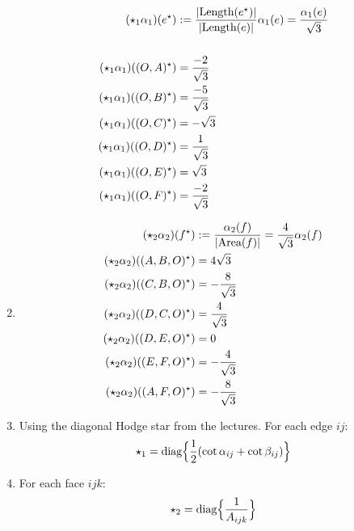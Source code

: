 \documentclass{article}
\def\nt{\notag}
\def\hal{\frac{1}{2}}
\begin{document}
\begin{enumerate}[label=(\alph*)]
    \begin{align}
        (\star_1\alpha_1)(e^\star) &:= \frac{|\text{Length}(e^\star)|}{|\text{Length}(e)|}\alpha_1(e) = \frac{\alpha_1(e)}{\sqrt3}\nt\\\nt\\
        (\star_1\alpha_1)((O,A)^\star) &= \frac{-2}{\sqrt3} \nt\\
        (\star_1\alpha_1)((O,B)^\star) &= \frac{-5}{\sqrt3} \nt\\
        (\star_1\alpha_1)((O,C)^\star) &= -\sqrt3 \nt\\
        (\star_1\alpha_1)((O,D)^\star) &= \frac{1}{\sqrt3} \nt\\
        (\star_1\alpha_1)((O,E)^\star) &= \sqrt3 \nt\\
        (\star_1\alpha_1)((O,F)^\star) &= \frac{-2}{\sqrt3} \nt
    \end{align}

    \item
    \begin{align}
        (\star_2\alpha_2)(f^\star) &:= \frac{\alpha_2(f)}{|\text{Area}( f )|} = \frac{4}{\sqrt3}\alpha_2(f)\nt\\
        (\star_2\alpha_2)((A,B,O)^\star) &= 4 \sqrt{3} \nt\\
        (\star_2\alpha_2)((C,B,O)^\star) &= -\frac{8}{\sqrt{3}} \nt\\
        (\star_2\alpha_2)((D,C,O)^\star) &= \frac{4}{\sqrt{3}} \nt\\
        (\star_2\alpha_2)((D,E,O)^\star) &= 0 \nt\\
        (\star_2\alpha_2)((E,F,O)^\star) &= -\frac{4}{\sqrt{3}} \nt\\
        (\star_2\alpha_2)((A,F,O)^\star) &= -\frac{8}{\sqrt{3}} \nt
    \end{align}

    \item
    Using the diagonal Hodge star from the lectures.
    For each edge $ij$:
    $$
        \star_1 = \text{diag}\Bigl\{\hal (\cot\alpha_{ij} + \cot\beta_{ij})\Bigr\}
    $$

    \item
    For each face $ijk$:
    $$
        \star_2 = \text{diag}\Bigl\{\frac{1}{A_{ijk}}\Bigr\}
    $$
\end{enumerate}
\end{document}
